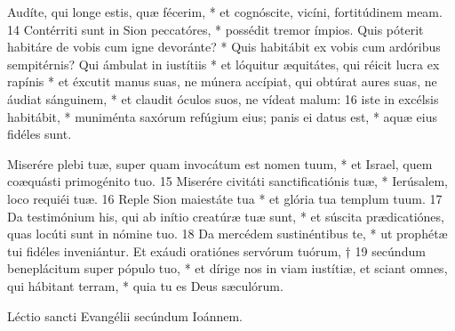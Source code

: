 \documentclass[RG2023_CarnetSpecial.tex]{subfiles}
\begin{document}

Audíte, qui longe estis, quæ fécerim, *
et cognóscite, vicíni, fortitúdinem meam.
14 Contérriti sunt in Sion peccatóres, *
possédit tremor ímpios.
Quis póterit habitáre de vobis cum igne devoránte? *
Quis habitábit ex vobis cum ardóribus sempitérnis?
Qui ámbulat in iustítiis *
et lóquitur æquitátes,
qui réicit lucra ex rapínis *
et éxcutit manus suas, ne múnera accípiat,
qui obtúrat aures suas, ne áudiat sánguinem, *
et claudit óculos suos, ne vídeat malum:
16 iste in excélsis habitábit, *
muniménta saxórum refúgium eius;
panis ei datus est, *
aquæ eius fidéles sunt.


Miserére plebi tuæ,
super quam invocátum est nomen tuum, *
et Israel, quem coæquásti primogénito tuo.
15 Miserére civitáti sanctificatiónis tuæ, *
Ierúsalem, loco requiéi tuæ.
16 Reple Sion maiestáte tua *
et glória tua templum tuum.
17 Da testimónium his,
qui ab inítio creatúræ tuæ sunt, *
et súscita prædicatiónes,
quas locúti sunt in nómine tuo.
18 Da mercédem sustinéntibus te, *
ut prophétæ tui fidéles inveniántur.
Et exáudi oratiónes servórum tuórum, †
19 secúndum beneplácitum super pópulo tuo, *
et dírige nos in viam iustítiæ,
et sciant omnes, qui hábitant terram, *
quia tu es Deus sæculórum.

Léctio sancti Evangélii secúndum Ioánnem.
\end{document}
